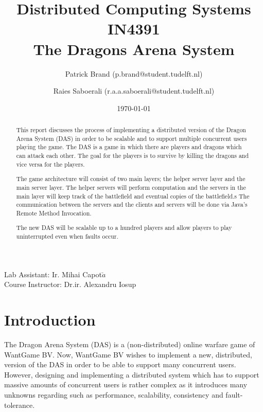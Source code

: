 \documentclass{article}
\title{Distributed Computing Systems IN4391\\ The Dragons Arena System %
}
\author{Patrick Brand (p.brand@student.tudelft.nl) \and
    Raies Saboerali (r.a.a.saboerali@student.tudelft.nl)
}
\date{\today}
\begin{document}
\maketitle
\thispagestyle{empty}
\begin{center}
Lab Assistant: Ir. Mihai Capot$\breve{a}$ \\
Course Instructor: Dr.ir. Alexandru Iosup
\end{center}

\begin{abstract}

This report discusses the process of implementing a distributed version of the Dragon Arena System (DAS) in order to be scalable and to support multiple concurrent users playing the game.
The DAS is a game in which there are players and dragons which can attack each other. 
The goal for the players is to survive by killing the dragons and vice versa for the players.

The game architecture will consist of two main layers; the helper server layer and the main server layer.
The helper servers will perform computation and the servers in the main layer will keep track of the battlefield and eventual copies of the battlefield.s
The communication between the servers and the clients and servers will be done via Java's Remote Method Invocation.

The new DAS will be scalable up to a hundred players and allow players to play uninterrupted even when faults occur.


\end{abstract}


\section{Introduction}


The Dragon Arena System (DAS) is a (non-distributed) online warfare game of WantGame BV.
Now, WantGame BV wishes to implement a new, distributed, version of the DAS in order to be able to support many concurrent users.
However, designing and implementing a distributed system which has to support massive amounts of concurrent users is rather complex as it introduces many unknowns regarding such as performance, scalability, consistency and fault-tolerance.
\end{document}
